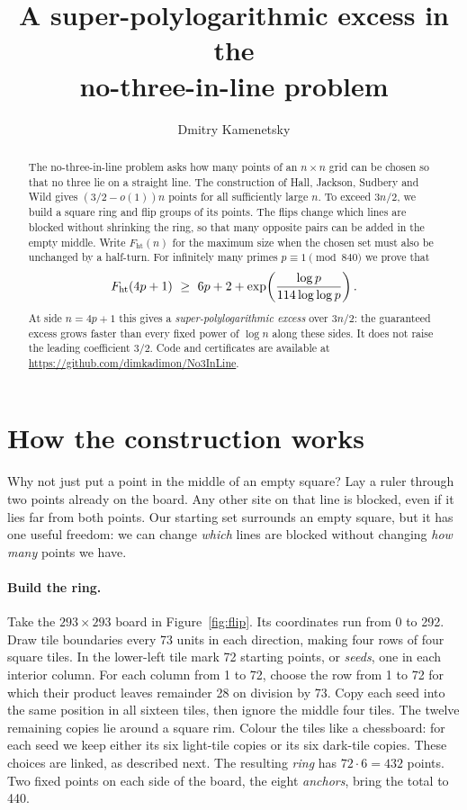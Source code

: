 \documentclass[11pt]{article}
\title{A super-polylogarithmic excess in the\texorpdfstring{\\}{ }no-three-in-line problem}
\author{Dmitry Kamenetsky}
\date{}
\newcommand{\mathcopy}[2]{\ifdefined\pdfliteral
  \pdfliteral direct{/Span << /ActualText <\pdfescapehex{\detokenize{#1}}> >> BDC}#2\pdfliteral direct{EMC}%
  \else#2\fi}
\begin{document}
\maketitle
\begin{abstract}
The no-three-in-line problem asks how many points of an $n\times n$ grid can be chosen so that no three lie on a straight line. The construction of Hall, Jackson, Sudbery and Wild gives $(3/2-o(1))n$ points for all sufficiently large $n$. To exceed $3n/2$, we build a square ring and flip groups of its points. The flips change which lines are blocked without shrinking the ring, so that many opposite pairs can be added in the empty middle. Write $F_{\mathrm{ht}}(n)$ for the maximum size when the chosen set must also be unchanged by a half-turn. For infinitely many primes $p\equiv1\pmod{840}$ we prove that
\[
 \mathcopy{F_ht(4p + 1) >= 6p + 2 + exp(log p / (114 log log p)).}{F_{\mathrm{ht}}(4p+1)\ \ge\ 6p+2+
 \exp\!\left(\frac{\log p}{114\log\log p}\right).}
\]
At side $n=4p+1$ this gives a \emph{super-polylogarithmic excess} over $3n/2$: the guaranteed excess grows faster than every fixed power of $\log n$ along these sides. It does not raise the leading coefficient $3/2$. Code and certificates are available at \mbox{\url{https://github.com/dimkadimon/No3InLine}}.
\end{abstract}
\section{How the construction works}\label{sec:intro}
Why not just put a point in the middle of an empty square? Lay a ruler through two points already on the board. Any other site on that line is blocked, even if it lies far from both points. Our starting set surrounds an empty square, but it has one useful freedom: we can change \emph{which} lines are blocked without changing \emph{how many} points we have.

\paragraph{Build the ring.} Take the $293\times293$ board in Figure~\ref{fig:flip}. Its coordinates run from 0 to 292. Draw tile boundaries every 73 units in each direction, making four rows of four square tiles. In the lower-left tile mark 72 starting points, or \emph{seeds}, one in each interior column. For each column from 1 to 72, choose the row from 1 to 72 for which their product leaves remainder 28 on division by 73. Copy each seed into the same position in all sixteen tiles, then ignore the middle four tiles. The twelve remaining copies lie around a square rim. Colour the tiles like a chessboard: for each seed we keep either its six light-tile copies or its six dark-tile copies. These choices are linked, as described next. The resulting \emph{ring} has $72\cdot6=432$ points. Two fixed points on each side of the board, the eight \emph{anchors}, bring the total to 440.
\end{document}
